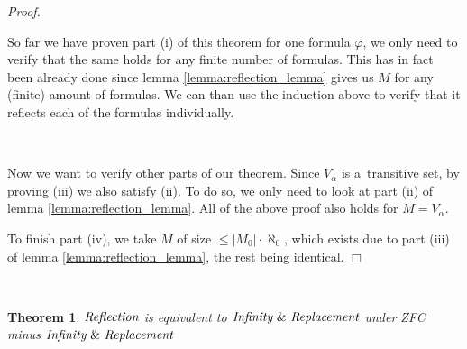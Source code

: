 \documentclass[12pt,a4paper]{article}
\newtheorem{theorem}{Theorem}[section]
\newenvironment{proof}
{\noindent \textit{Proof.}}
{\hspace*{\fill} $\Box$}
\begin{document}
\begin{proof}
\

So far we have proven part (i) of this theorem for one formula $\varphi$, we only need to verify that the same holds for any finite number of formulas. This has in fact been already done since lemma \ref{lemma:reflection_lemma} gives us $M$ for any (finite) amount of formulas. We can than use the induction above  to verify that it reflects each of the formulas individually. 

\

Now we want to verify other parts of our theorem. Since $V_\alpha$ is a~transitive set, by proving (iii) we also satisfy (ii). To do so, we only need to look at part (ii) of lemma \ref{lemma:reflection_lemma}. All of the above proof also holds for $M = V_\alpha$. 

To finish part (iv), we take $M$ of size $\leq |M_0| \cdot\aleph_0$, which exists due to part (iii) of lemma \ref{lemma:reflection_lemma}, the rest being identical.
\end{proof}

\

\begin{theorem}
$\emph{Reflection}$ is equivalent to $\emph{Infinity}\ \&\ \emph{Replacement}$ under ZFC minus $\emph{Infinity}\ \&\ \emph{Replacement}$
\end{theorem}

\
\end{document}
